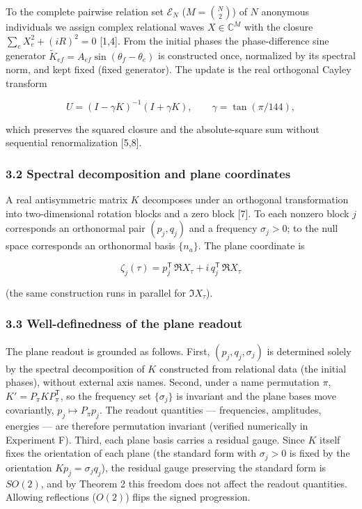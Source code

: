 \documentclass[
  a4paper,
]{article}
\begin{document}
To the complete pairwise relation set \(\mathcal E_N\)
(\(M=\binom{N}{2}\)) of \(N\) anonymous individuals we assign complex
relational waves \(X\in\mathbb C^M\) with the closure
\(\sum_eX_e^2+(iR)^2=0\) {[}1,4{]}. From the initial phases the
phase-difference sine generator
\(\widetilde K_{ef}=A_{ef}\sin(\theta_f-\theta_e)\) is constructed once,
normalized by its spectral norm, and kept fixed (fixed generator). The
update is the real orthogonal Cayley transform

\[
U=(I-\gamma K)^{-1}(I+\gamma K),\qquad \gamma=\tan(\pi/144),
\]

which preserves the squared closure and the absolute-square sum without
sequential renormalization {[}5,8{]}.

\subsubsection{3.2 Spectral decomposition and plane
coordinates}\label{spectral-decomposition-and-plane-coordinates}

A real antisymmetric matrix \(K\) decomposes under an orthogonal
transformation into two-dimensional rotation blocks and a zero block
{[}7{]}. To each nonzero block \(j\) corresponds an orthonormal pair
\((p_j,q_j)\) and a frequency \(\sigma_j>0\); to the null space
corresponds an orthonormal basis \(\{n_a\}\). The plane coordinate is

\[
\zeta_j(\tau)=p_j^{\mathsf T}\,\Re X_\tau+i\,q_j^{\mathsf T}\,\Re X_\tau
\]

(the same construction runs in parallel for \(\Im X_\tau\)).

\subsubsection{3.3 Well-definedness of the plane
readout}\label{well-definedness-of-the-plane-readout}

The plane readout is grounded as follows. First, \((p_j,q_j,\sigma_j)\)
is determined solely by the spectral decomposition of \(K\) constructed
from relational data (the initial phases), without external axis names.
Second, under a name permutation \(\pi\),
\(K'=P_\pi KP_\pi^{\mathsf T}\), so the frequency set \(\{\sigma_j\}\)
is invariant and the plane bases move covariantly,
\(p_j\mapsto P_\pi p_j\). The readout quantities --- frequencies,
amplitudes, energies --- are therefore permutation invariant (verified
numerically in Experiment F). Third, each plane basis carries a residual
gauge. Since \(K\) itself fixes the orientation of each plane (the
standard form with \(\sigma_j>0\) is fixed by the orientation
\(Kp_j=\sigma_jq_j\)), the residual gauge preserving the standard form
is \(SO(2)\), and by Theorem 2 this freedom does not affect the readout
quantities. Allowing reflections (\(O(2)\)) flips the signed
progression.
\end{document}

